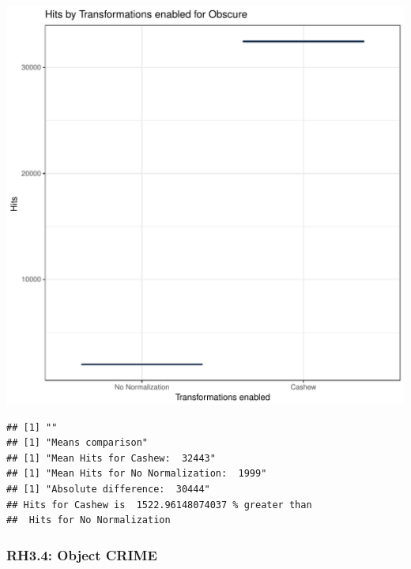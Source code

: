 \documentclass{article}\usepackage[]{graphicx}\usepackage[]{color}
\makeatletter
\def\maxwidth{ %
  \ifdim\Gin@nat@width>\linewidth
    \linewidth
  \else
    \Gin@nat@width
  \fi
}
\newenvironment{kframe}{%
 \def\at@end@of@kframe{}%
 \ifinner\ifhmode%
  \def\at@end@of@kframe{\end{minipage}}%
  \begin{minipage}{\columnwidth}%
 \fi\fi%
 \def\FrameCommand##1{\hskip\@totalleftmargin \hskip-\fboxsep
 \colorbox{shadecolor}{##1}\hskip-\fboxsep
     \hskip-\linewidth \hskip-\@totalleftmargin \hskip\columnwidth}%
 \MakeFramed {\advance\hsize-\width
   \@totalleftmargin\z@ \linewidth\hsize
   \@setminipage}}%
 {\par\unskip\endMakeFramed%
 \at@end@of@kframe}
\newenvironment{knitrout}{}{} %
\makeatother
\begin{document}
\begin{knitrout}
\color{fgcolor}
\includegraphics[width=\maxwidth]{figure/RH3_obscure-1} 
\begin{kframe}

{\ttfamily\noindent\bfseries\color{errorcolor}{\#\# Error in eval(expr, envir, enclos): object 'shap\_cashew\_obscure' not found}}\begin{verbatim}
## [1] ""
## [1] "Means comparison"
## [1] "Mean Hits for Cashew:  32443"
## [1] "Mean Hits for No Normalization:  1999"
## [1] "Absolute difference:  30444"
## Hits for Cashew is  1522.96148074037 % greater than 
##  Hits for No Normalization
\end{verbatim}
\end{kframe}
\end{knitrout}


\subsubsection{RH3.4: Object CRIME}
\end{document}
